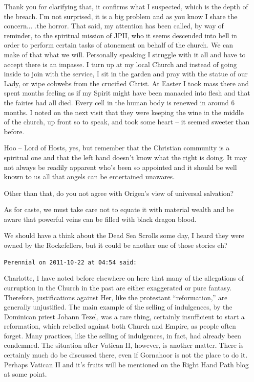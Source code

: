 \begin{footnotesize}
\begin{sffamily}
Thank you for clarifying that, it confirms what I suspected, which is the depth of the breach. I'm not surprised, it is a big problem and as you know I share the concern... .the horror. That said, my attention has been called, by way of reminder, to the spiritual mission of JPII, who it seems descended into hell in order to perform certain tasks of atonement on behalf of the church. We can make of that what we will. Personally speaking I struggle with it all and have to accept there is an impasse. I turn up at my local Church and instead of going inside to join with the service, I sit in the garden and pray with the statue of our Lady, or wipe cobwebs from the crucified Christ. At Easter I took mass there and spent months feeling as if my Spirit might have been manacled into flesh and that the fairies had all died. Every cell in the human body is renewed in around 6 months. I noted on the next visit that they were keeping the wine in the middle of the church, up front so to speak, and took some heart -- it seemed sweeter than before.

Hoo -- Lord of Hosts, yes, but remember that the Christian community is a spiritual one and that the left hand doesn't know what the right is doing. It may not always be readily apparent who's been so appointed and it should be well known to us all that angels can be entertained unawares.

Other than that, do you not agree with Origen's view of universal salvation?

As for caste, we must take care not to equate it with material wealth and be aware that powerful veins can be filled with black dragon blood.

We should have a think about the Dead Sea Scrolls some day, I heard they were owned by the Rockefellers, but it could be another one of those stories eh?

\hfill

\texttt{Perennial on 2011-10-22 at 04:54 said:}

Charlotte, I have noted before elsewhere on here that many of the allegations of curruption in the Church in the past are either exaggerated or pure fantasy. Therefore, justifications against Her, like the protestant ``reformation,'' are generally unjustified. The main example of the selling of indulgences, by the Dominican priest Johann Tezel, was a rare thing, certainly insufficient to start a reformation, which rebelled against both Church and Empire, as people often forget. Many practices, like the selling of indulgences, in fact, had already been condemned. The situation after Vatican II, however, is another matter. There is certainly much do be discussed there, even if Gornahoor is not the place to do it. Perhaps Vatican II and it's fruits will be mentioned on the Right Hand Path blog at some point.


\end{sffamily}
\end{footnotesize}
